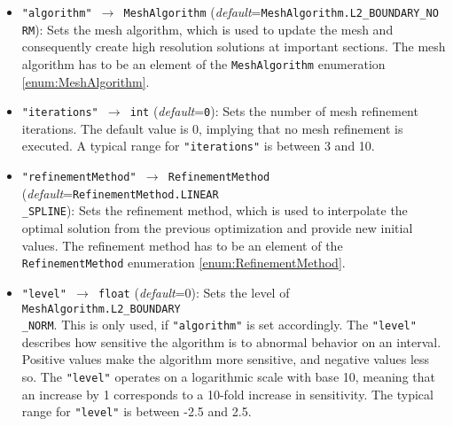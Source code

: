 \documentclass[12pt]{article}
\begin{document}
\begin{mdframed}[backgroundcolor=gray!10, roundcorner=10pt,
		linewidth=1pt]

	\begin{itemize}

		\label{flag:MeshAlgorithm}
		\item \texttt{"algorithm" $\rightarrow$ MeshAlgorithm}
		      (\emph{default}=\texttt{MeshAlgorithm.L2\_BOUNDARY\_NO\\RM}): Sets the
		      mesh algorithm, which is used to update the mesh and
		      consequently create high
		      resolution solutions at important sections. The mesh
		      algorithm has to be an
		      element of the \texttt{MeshAlgorithm} enumeration
		      \eqref{enum:MeshAlgorithm}.

		      \label{flag:meshIterations}
		\item \texttt{"iterations" $\rightarrow$ int}
		      (\emph{default}=\texttt{0}): Sets the number of mesh
		      refinement iterations. The
		      default value is 0, implying that no mesh refinement is
		      executed.
		      A typical range for \texttt{"iterations"} is between
		      3 and 10.

		      \label{flag:RefinementMethod}
		\item \texttt{"refinementMethod" $\rightarrow$
			      RefinementMethod}
		      (\emph{default}=\texttt{RefinementMethod.LINEAR\\\_SPLINE}): Sets the
		      refinement method, which is used to interpolate the
		      optimal solution from the
		      previous optimization and provide new initial values. The
		      refinement method has
		      to be an element of the \texttt{RefinementMethod}
		      enumeration
		      \eqref{enum:RefinementMethod}.

		      \label{flag:meshLevel}
		\item \texttt{"level" $\rightarrow$ float}
		      (\emph{default}=0): Sets
		      the level of \texttt{MeshAlgorithm.L2\_BOUNDARY\\\_NORM}.
		      This is only used, if
		      \texttt{"algorithm"} is set accordingly. The
		      \texttt{"level"} describes
		      how sensitive the algorithm is to abnormal behavior on an
		      interval. Positive
		      values make the algorithm more sensitive, and negative
		      values less so. The
		      \texttt{"level"} operates on a logarithmic scale with
		      base 10, meaning that
		      an increase by 1 corresponds to a 10-fold increase in
		      sensitivity. The typical
		      range for \texttt{"level"} is between -2.5 and 2.5.


\end{itemize}
\end{mdframed}
\end{document}
